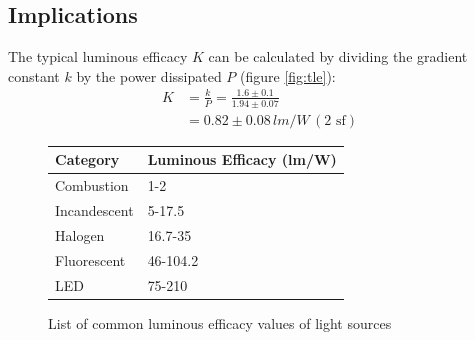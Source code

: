 \documentclass[a4paper,12pt]{article}
\newcommand{\tsf}{\,\text{sf}}
\begin{document}
\subsection{Implications}




The typical luminous efficacy $K$ can be calculated by dividing the gradient constant $k$ by the power dissipated $P$ (figure \ref{fig:tle}):
\begin{align*}
    K &= \frac{k}{P} = \frac{1.6 \pm 0.1}{1.94 \pm 0.07}\\
    &= 0.82 \pm 0.08\,\si{lm\per W}\,(2\, \tsf)
\end{align*}

\begin{figure}
    \centering
    \begin{tabular}{l|l}
        Category     & Luminous Efficacy (lm/W) \\ \hline
        Combustion   & 1-2                      \\
        Incandescent & 5-17.5                   \\
        Halogen      & 16.7-35                  \\
        Fluorescent  & 46-104.2                 \\
        LED          & 75-210
    \end{tabular}
    \caption{List of common luminous efficacy values of light sources\protect\footnotemark}
    \label{tbl:leff}
\end{figure}
\end{document}
